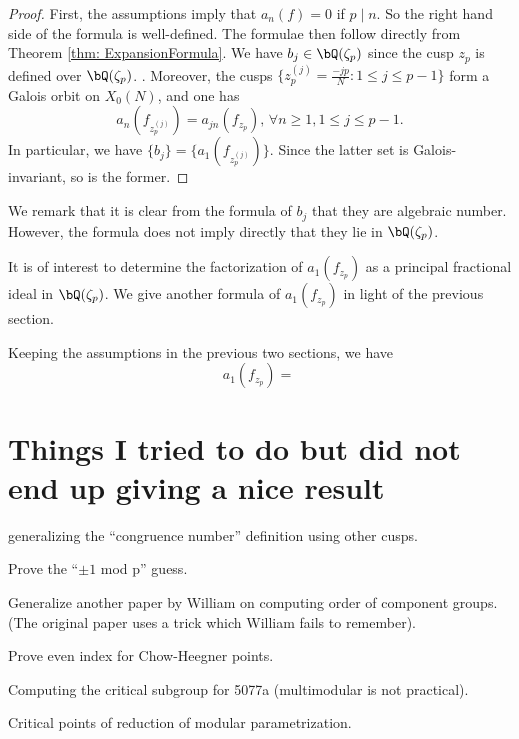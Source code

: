 \documentclass [11pt, proquest] {uwthesis}[2015/03/03]
\begin{document}
\begin{proof}
First, the assumptions imply that $a_{n}(f) =  0$ if $p \mid n$. So the right hand side of the formula is well-defined. 
The formulae then follow directly from Theorem \ref{thm: ExpansionFormula}.   We have $b_j \in \bQ(\zeta_p)$ since the cusp $z_p$ is defined over $\bQ(\zeta_p)$. . Moreover, the cusps $\{z_p^{(j)} = \frac{-jp}{N}: 1 \leq j \leq p-1\}$ form a Galois orbit on $X_0(N)$, and one has 
\[
	a_n(f_{z_p^{(j)}}) = a_{jn}(f_{z_p}), \, \forall n \geq 1, 1 \leq j \leq p-1. 
\]
In particular, we have $\{b_j\} = \{a_1(f_{z_p^{(j)}})\}$. Since the latter set is Galois-invariant, so is the former. 
\end{proof}

We remark that it is clear from the formula of $b_j$ that they are algebraic number. However, the formula does not imply directly that they lie in $\bQ(\zeta_p)$. 

It is of interest to determine the factorization of $a_1(f_{z_p})$ as a principal fractional ideal in $\bQ(\zeta_p)$. We give another formula of $a_1(f_{z_p})$ in light of the previous section. 

\begin{Lemma}
Keeping the assumptions in the previous two sections, we have 
$$a_1(f_{z_p}) = \frac{}{}$$
\end{Lemma}


\chapter{Things I tried to do but did not end up giving a nice result}

generalizing the ``congruence number'' definition using other cusps.  

Prove the ``$\pm 1$ mod p'' guess. 

Generalize another paper by William on computing order of component groups. (The original paper uses a trick which 
William fails to remember). 

Prove even index for Chow-Heegner points. 

Computing the critical subgroup for 5077a (multimodular is not practical). 

Critical points of reduction of modular parametrization. 


\nocite{*}


\end{document}
